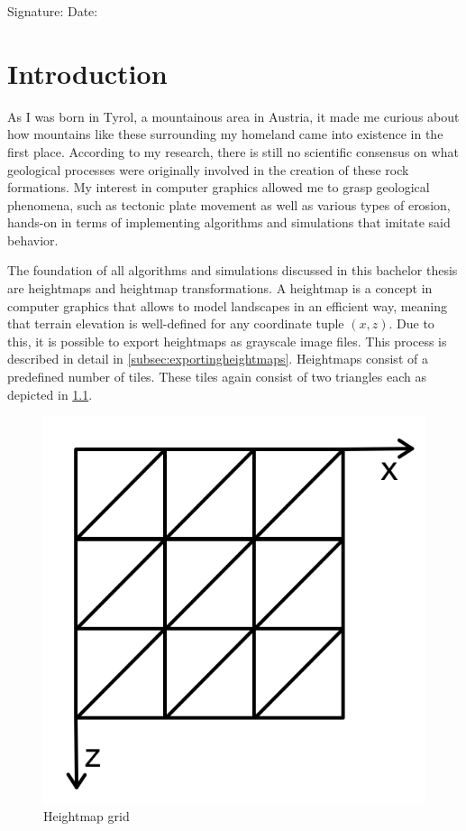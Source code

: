 \documentclass[11pt,a4paper,twoside,openright]{report}
\begin{document}
\vspace{15mm}

\noindent Signature: \underline{\hspace{5cm}} \hspace{1cm}  Date: \underline{\hspace{5cm}}


\chapter{Introduction}
\label{sec:intro}

\pagestyle{fancy}

As I was born in Tyrol, a mountainous area in Austria, it made me curious about how mountains like these surrounding my homeland came into existence in the first place. According to my research, there is still no scientific consensus on what geological processes were originally involved in the creation of these rock formations. My interest in computer graphics allowed me to grasp geological phenomena, such as tectonic plate movement as well as various types of erosion, hands-on in terms of implementing algorithms and simulations that imitate said behavior.

The foundation of all algorithms and simulations discussed in this bachelor thesis are heightmaps and heightmap transformations. A heightmap is a concept in computer graphics that allows to model landscapes in an efficient way, meaning that terrain elevation is well-defined for any coordinate tuple $(x,z)$. Due to this, it is possible to export heightmaps as grayscale image files. This process is described in detail in \cref{subsec:exportingheightmaps}. Heightmaps consist of a predefined number of tiles. These tiles again consist of two triangles each as depicted in \cref{fig:heightmapgrid}.

\begin{figure}[h]
\centering
\includegraphics[width=0.25\linewidth]{heightmapgrid.png}
\caption{Heightmap grid}\label{fig:heightmapgrid}
\end{figure}
\end{document}
